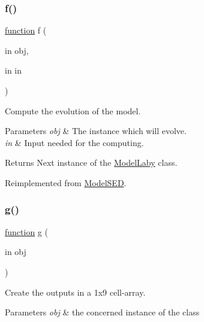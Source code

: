 \subsubsection{\texorpdfstring{f()}{f()}}
{\footnotesize\ttfamily \hyperlink{_plan__desuma_functions_8m_ac2ffb26d6f42d3bbcd7847b0873403f4}{function} f (\begin{DoxyParamCaption}\item[{in}]{obj,  }\item[{in}]{in }\end{DoxyParamCaption})\hspace{0.3cm}{\ttfamily [virtual]}}



Compute the evolution of the model. 


\begin{DoxyParams}{Parameters}
{\em obj} & The instance which will evolve. \\
\hline
{\em in} & Input needed for the computing. \\
\hline
\end{DoxyParams}
\begin{DoxyReturn}{Returns}
Next instance of the \hyperlink{class_model_laby}{Model\+Laby} class. 
\end{DoxyReturn}


Reimplemented from \hyperlink{class_model_s_e_d_ac36f9451c43b120828af4380858f2024}{Model\+S\+ED}.

\mbox{\label{class_model_laby_a07dadfabe92bf9a144b8a862720e7746}} 
\subsubsection{\texorpdfstring{g()}{g()}}
{\footnotesize\ttfamily \hyperlink{_plan__desuma_functions_8m_ac2ffb26d6f42d3bbcd7847b0873403f4}{function} g (\begin{DoxyParamCaption}\item[{in}]{obj }\end{DoxyParamCaption})\hspace{0.3cm}{\ttfamily [virtual]}}



Create the outputs in a 1x9 cell-\/array. 


\begin{DoxyParams}{Parameters}
{\em obj} & the concerned instance of the class \\
\hline
\end{DoxyParams}


